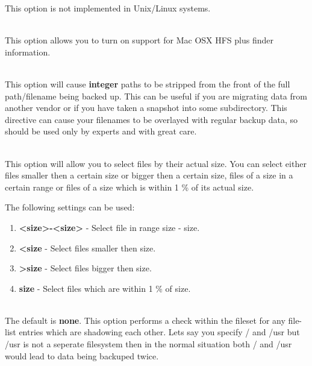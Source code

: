 \begin{description}
   This option is not implemented in Unix/Linux systems.

\item [hfsplussupport=yes{\textbar}no] \hfill \\
   This option allows you to turn on support for Mac OSX HFS plus
   finder information.

\item [strippath={\textless}integer{\textgreater}] \hfill \\
   This option will cause {\bf integer} paths to be stripped from
   the front of the full path/filename being backed up. This can
   be useful if you are migrating data from another vendor or if
   you have taken a snapshot into some subdirectory.  This directive
   can cause your filenames to be overlayed with regular backup data,
   so should be used only by experts and with great care.

\item [size=sizeoption] \hfill \\
   This option will allow you to select files by their actual size.
   You can select either files smaller then a certain size or bigger
   then a certain size, files of a size in a certain range or files
   of a size which is within 1 \% of its actual size.

   The following settings can be used:

   \begin{enumerate}
   \item {\bf {\textless}size{\textgreater}-{\textless}size{\textgreater}} - Select file in range size - size.
   \item {\bf {\textless}size} - Select files smaller then size.
   \item {\bf {\textgreater}size} - Select files bigger then size.
   \item {\bf size} - Select files which are within 1 \% of size.
   \end{enumerate}

\item [shadowing=none{\textbar}localwarn{\textbar}localremove{\textbar}globalwarn{\textbar}globalremove] \hfill \\
   The default is {\bf none}. This option performs a check within the
   fileset for any file-list entries which are shadowing each other.
   Lets say you specify / and /usr but /usr is not a seperate filesystem
   then in the normal situation both / and /usr would lead to data being
   backuped twice.


\end{description}
